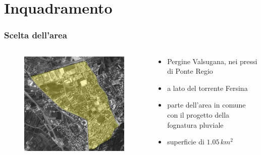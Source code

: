 \documentclass{beamer}
\begin{document}
\section{Inquadramento}
\begin{frame}
 \frametitle{Scelta dell'area}
 \begin{columns}
 \begin{column}{.5\textwidth}
  \begin{figure}
   \centering
   \includegraphics[width=\linewidth]{images/area}
  \end{figure}
  \end{column}

 \begin{column}{.5\textwidth}
  \begin{itemize}[<+->]
   \item Pergine Valsugana, nei pressi di Ponte Regio
   \item a lato del torrente Fersina
   \item parte dell'area in comune con il progetto della fognatura pluviale
   \item superficie di $1.05\,km^2$
  \end{itemize}
 \end{column}
 \end{columns}
 
\end{frame}
\end{document}
